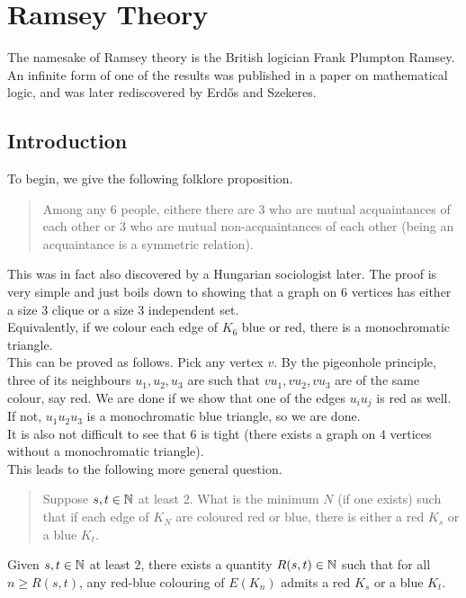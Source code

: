 \section{Ramsey Theory}

The namesake of Ramsey theory is the British logician Frank Plumpton Ramsey. An infinite form of one of the results was published in a paper on mathematical logic, and was later rediscovered by Erd\H{o}s and Szekeres.

\subsection{Introduction}

	To begin, we give the following folklore proposition.
	\begin{quote}
		Among any 6 people, eithere there are $3$ who are mutual acquaintances of each other or $3$ who are mutual non-acquaintances of each other (being an acquaintance is a symmetric relation).
	\end{quote}

	This was in fact also discovered by a Hungarian sociologist later. The proof is very simple and just boils down to showing that a graph on $6$ vertices has either a size $3$ clique or a size $3$ independent set.\\
	Equivalently, if we colour each edge of $K_6$ blue or red, there is a monochromatic triangle.\\
	This can be proved as follows. Pick any vertex $v$. By the pigeonhole principle, three of its neighbours $u_1,u_2,u_3$ are such that $vu_1,vu_2,vu_3$ are of the same colour, say red. We are done if we show that one of the edges $u_iu_j$ is red as well. If not, $u_1u_2u_3$ is a monochromatic blue triangle, so we are done.\\
	It is also not difficult to see that $6$ is tight (there exists a graph on $4$ vertices without a monochromatic triangle).\\

	This leads to the following more general question.
	\begin{quote}
		Suppose $s,t\in\mathbb{N}$ at least $2$. What is the minimum $N$ (if one exists) such that if each edge of $K_N$ are coloured red or blue, there is either a red $K_s$ or a blue $K_t$.
	\end{quote}

	\begin{ftheo}
		\label{theo: ramsey number finite}
		Given $s,t\in\mathbb{N}$ at least $2$, there exists a quantity $R(s,t) \in \mathbb{N}$ such that for all $n \ge R(s,t)$, any red-blue colouring of $E(K_n)$ admits a red $K_s$ or a blue $K_t$.
	\end{ftheo}

